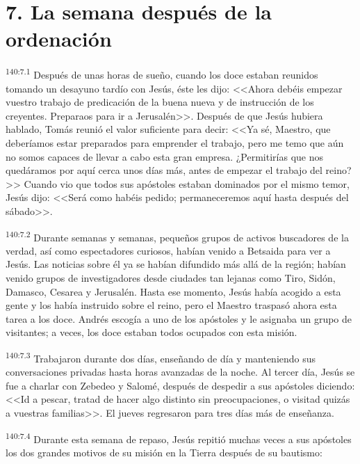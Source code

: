\section*{7. La semana después de la ordenación}
\par 
\textsuperscript{140:7.1} Después de unas horas de sueño, cuando los doce estaban reunidos tomando un desayuno tardío con Jesús, éste les dijo: <<Ahora debéis empezar vuestro trabajo de predicación de la buena nueva y de instrucción de los creyentes. Preparaos para ir a Jerusalén>>. Después de que Jesús hubiera hablado, Tomás reunió el valor suficiente para decir: <<Ya sé, Maestro, que deberíamos estar preparados para emprender el trabajo, pero me temo que aún no somos capaces de llevar a cabo esta gran empresa. ¿Permitirías que nos quedáramos por aquí cerca unos días más, antes de empezar el trabajo del reino?>> Cuando vio que todos sus apóstoles estaban dominados por el mismo temor, Jesús dijo: <<Será como habéis pedido; permaneceremos aquí hasta después del sábado>>.

\par 
\textsuperscript{140:7.2} Durante semanas y semanas, pequeños grupos de activos buscadores de la verdad, así como espectadores curiosos, habían venido a Betsaida para ver a Jesús. Las noticias sobre él ya se habían difundido más allá de la región; habían venido grupos de investigadores desde ciudades tan lejanas como Tiro, Sidón, Damasco, Cesarea y Jerusalén. Hasta ese momento, Jesús había acogido a esta gente y los había instruido sobre el reino, pero el Maestro traspasó ahora esta tarea a los doce. Andrés escogía a uno de los apóstoles y le asignaba un grupo de visitantes; a veces, los doce estaban todos ocupados con esta misión.

\par 
\textsuperscript{140:7.3} Trabajaron durante dos días, enseñando de día y manteniendo sus conversaciones privadas hasta horas avanzadas de la noche. Al tercer día, Jesús se fue a charlar con Zebedeo y Salomé, después de despedir a sus apóstoles diciendo: <<Id a pescar, tratad de hacer algo distinto sin preocupaciones, o visitad quizás a vuestras familias>>. El jueves regresaron para tres días más de enseñanza.

\par 
\textsuperscript{140:7.4} Durante esta semana de repaso, Jesús repitió muchas veces a sus apóstoles los dos grandes motivos de su misión en la Tierra después de su bautismo:

